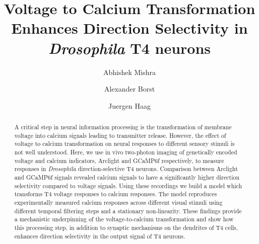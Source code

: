 \documentclass[9pt,lineno]{elife}
\title{Voltage to Calcium Transformation Enhances Direction Selectivity in \textit{Drosophila} T4 neurons}
\author[1,2]{Abhishek Mishra}
\author[1,2]{Alexander Borst}
\author[1]{Juergen Haag}
\affil[1]{Max Planck Institute for Biological Intelligence (in foundation), Martinsried, Germany}
\affil[2]{Graduate School of Systemic Neurosciences, LMU Munich, Martinsried, Germany}
\begin{document}
\maketitle

\begin{abstract}
A critical step in neural information processing is the transformation of membrane voltage into calcium signals leading to transmitter release. However, the effect of voltage to calcium transformation on neural responses to different sensory stimuli is not well understood. Here, we use in vivo two-photon imaging of genetically encoded voltage and calcium indicators, Arclight and GCaMP6f respectively, to measure responses in \textit{Drosophila} direction-selective T4 neurons. Comparison between Arclight and GCaMP6f signals revealed calcium signals to have a significantly higher direction selectivity compared to voltage signals. Using these recordings we build a model which transforms T4 voltage responses to calcium responses. The model reproduces experimentally measured calcium responses across different visual stimuli using different temporal filtering steps and a stationary non-linearity. These findings provide a mechanistic underpinning of the voltage-to-calcium transformation and show how this processing step, in addition to synaptic mechanisms on the dendrites of T4 cells, enhances direction selectivity in the output signal of T4 neurons.


\end{abstract}
\end{document}
